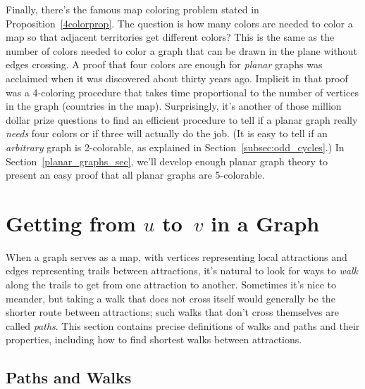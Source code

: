 Finally, there's the famous map coloring problem stated in
Proposition~\ref{4colorprop}.  The question is how many colors are needed
to color a map so that adjacent territories get different colors?  This is
the same as the number of colors needed to color a graph that can be drawn
in the plane without edges crossing.  A proof that four colors are enough
for  \emph{planar} graphs was acclaimed when it was
discovered about thirty years ago.  Implicit in that proof was a
4-coloring procedure that takes time proportional to the number of
vertices in the graph (countries in the map).  Surprisingly, it's another
of those million dollar prize questions to find an efficient procedure to
tell if a planar graph really \emph{needs} four colors or if three will
actually do the job.  (It is easy to tell if an \emph{arbitrary} graph is
2-colorable, as explained in Section~\ref{subsec:odd_cycles}.)  In
Section~\ref{planar_graphs_sec}, we'll develop enough planar graph theory
to present an easy proof that all planar graphs are 5-colorable.


\section{Getting from $u$ to~$v$ in a Graph}\label{sec:connectedness}
\begin{editingnotes}
\end{editingnotes}
When a graph serves as a map, with vertices representing local attractions
and edges representing trails between attractions, it's natural to look
for ways to \emph{walk} along the trails to get from one attraction to
another.  Sometimes it's nice to meander, but taking a walk that does not
cross itself would generally be the shorter route between attractions;
such walks that don't cross themselves are called \emph{paths}.  This
section contains precise definitions of walks and paths and their
properties, including how to find shortest walks between attractions.

\subsection{Paths and Walks}


